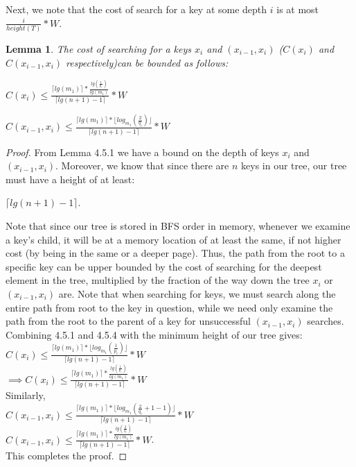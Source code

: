 \documentclass[letterpaper,12pt,titlepage,oneside,final]{book}
\theoremstyle{plain}
\newtheorem{lem}[thm]{Lemma}
\begin{document}
Next, we note that the cost of search for a key at some depth $i$ is at most $\frac{i}{height(T)}* W$.

\begin{lem}
The cost of searching for a keys $x_i$ and $(x_{i-1},x_i)$ ($C(x_i)$ and $C(x_{i-1},x_i)$ respectively)can be bounded as follows: 

\begin{center} $C(x_i) \leq \frac{\lceil lg(m_1) \rceil * \frac{lg(\frac{1}{p_i})}{lg(m_1)}}{\lceil lg(n+1) - 1 \rceil} * W$ 
\end{center}


\begin{center}
 $C(x_{i-1},x_i) \leq \frac{\lceil lg(m_1) \rceil * \lfloor log_{m_1}(\frac{2}{q_i}) \rfloor}{\lceil lg(n+1) - 1 \rceil} * W$ 
 \end{center}
\end{lem}

\begin{proof}
From Lemma 4.5.1 we have a bound on the depth of keys $x_i$ and $(x_{i-1},x_i)$. Moreover, we know that since there are $n$ keys in our tree, our tree must have a height of at least:
\begin{center}
 $\lceil lg(n+1) - 1 \rceil$.
\end{center}
Note that since our tree is stored in BFS order in memory, whenever we examine a key's child, it will be at a memory location of at least the same, if not higher cost (by being in the same or a deeper page). Thus, the path from the root to a specific key can be upper bounded by the cost of searching for the deepest element in the tree, multiplied by the fraction of the way down the tree $x_i$ or $(x_{i-1},x_i)$ are. Note that when searching for keys, we must search along the entire path from root to the key in question, while we need only examine the path from the root to the parent of a key for unsuccessful $(x_{i-1},x_i)$ searches. Combining 4.5.1 and 4.5.4 with the minimum height of our tree gives: \\

 $C(x_i) \leq \frac{\lceil lg(m_1) \rceil * \lfloor log_{m_1}(\frac{1}{p_i}) \rfloor}{\lceil lg(n+1) - 1 \rceil} * W$  \\
 $\implies C(x_i) \leq \frac{\lceil lg(m_1) \rceil * \frac{lg(\frac{1}{p_i})}{lg(m_1)}}{\lceil lg(n+1) - 1 \rceil} * W$ \\
 
 Similarly, \\
 $C(x_{i-1},x_i) \leq \frac{\lceil lg(m_1) \rceil * \lfloor log_{m_1}(\frac{2}{q_i} + 1 - 1) \rfloor}{\lceil lg(n+1) - 1 \rceil} * W$  \\
 $C(x_{i-1},x_i) \leq \frac{\lceil lg(m_1) \rceil * \frac{lg(\frac{2}{q_i})}{lg(m_1)}}{\lceil lg(n+1) - 1 \rceil} * W$. \\ 
 
This completes the proof. 
 


\end{proof}
\end{document}

